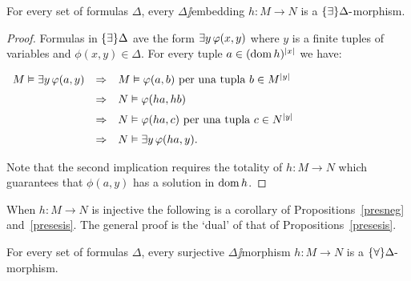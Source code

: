 \documentclass[creche.tex]{subfiles}
\begin{document}
\begin{proposition}\label{presesis}
For every set of formulas $\Delta$, every $\Delta\jj$embedding $h:M\to N$ is a $\{\exists\}\Delta\mbox{-}$mor\-phism.
\end{proposition}
\begin{proof}
Formulas in $\{\exists\}\Delta$ ave the form $\exists y\,\varphi(x,y)$ where $y$ is a finite tuples of variables and  $\phi(x,y)\in\Delta$. For every tuple $a\in(\mathop{\rm dom} h)^{|x|}$ we have:

\hfil
$\begin{array}{rcl}
M\models\E y\,\phi(a,y) %
&\IMP& M\models\phi(a,b)\textrm{ per una tupla } b\in M^{|y|}  \\[2mm]
&\IMP& N\models\phi(ha,hb) \\[2mm]
&\IMP& N\models\phi(ha,c)\textrm{ per una tupla } c\in N^{|y|}  \\[2mm]
&\IMP& N\models\E y\,\phi(ha,y).\\
\end{array}$

Note that the second implication requires the totality of  $h:M\to N$ which guarantees that $\phi(a,y)$ has a solution in $\mathop{\rm dom} h$.
\end{proof}

When $h:M\to N$ is injective the following is a corollary of Propositions~\ref{presneg} and~\ref{presesis}. The general proof is the `dual' of that of Propositions~\ref{presesis}.

\begin{proposition}\label{presuniv}
For every set of formulas $\Delta$, every surjective $\Delta\jj$morphism $h:M\to N$ is a $\{\forall\}\Delta\mbox{-}$mor\-phism.\QED
\end{proposition}
\end{document}
